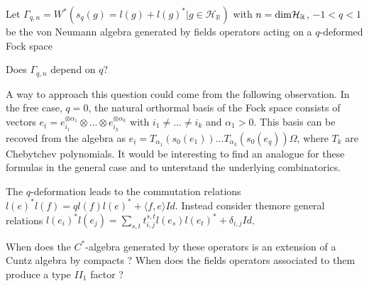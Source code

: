 \documentclass[12pt,letterpaper, reqno]{amsart}
\begin{document}
\begin{problemblock}
 Let $\Gamma_{q,n}=W^*(s_q(g)=l(g)+l(g)^* |g\in \mathcal H_\mathbb R)$ with 
$n=\rm{ dim} \mathcal H_\mathbb R$, $-1<q<1$ 
be the von Neumann algebra generated by 
fields operators acting on a $q$-deformed Fock space
\begin{problem}
Does $\Gamma_{q,n}$
depend on $q$?
\end{problem}

A way to approach this question could come from
 the following observation. In the free case, $q=0$, 
the natural orthormal basis of 
the Fock space  consists of vectors 
$e_{\underline i}=e^{\otimes\alpha_1}_{i_1}\otimes ...
\otimes e^{\otimes\alpha_k}_{i_k}$ with $i_1\neq ...\neq i_k$ and 
$\alpha_1>0$. This basis can be recoved from the algebra as 
$e_{\underline i}=T_{\alpha_1}(s_0(e_1))...T_{\alpha_k}(s_0(e_q))\Omega$, 
where $T_k$ are Chebytchev polynomials. It 
would be interesting to find an analogue for these formulas in the general 
case and to unterstand the underlying combinatorics.

 \end{problemblock}

\begin{problemblock}

The $q$-deformation leads to the commutation relations $l(e)^*l(f)=ql(f)l(e)^*+\langle f,e \rangle Id$. Instead consider themore general relations
$l(e_i)^*l(e_j)=\sum_{s,t} t^{s,t}_{i,j} l(e_s)l(e_t)^*+\delta_{i,j} Id$.

\begin{problem}
When does the $C^*$-algebra generated by these operators is an extension of a 
Cuntz algebra by compacts ? When does the fields operators associated to them 
produce a type $II_1$ factor ?
\end{problem}
\end{problemblock}
\end{document}
